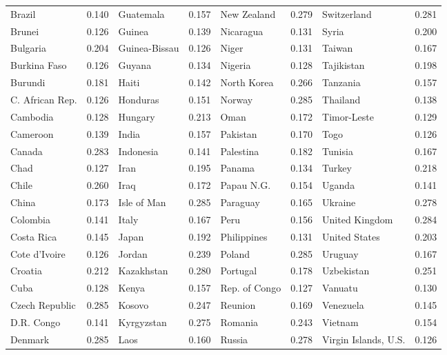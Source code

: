\documentclass[12pt]{article}
\begin{document}
\begin{table}[!htb]
\begin{center}
{\begin{tabularx}{\textwidth}{lXlXlXlX}
Brazil &     0.140 & Guatemala &     0.157 & New Zealand &     0.279 & Switzerland &     0.281 \\
Brunei &     0.126 & Guinea &     0.139 & Nicaragua &     0.131 & Syria &     0.200 \\
Bulgaria &     0.204 & Guinea-Bissau &     0.126 & Niger &     0.131 & Taiwan &     0.167 \\
Burkina Faso &     0.126 & Guyana &     0.134 & Nigeria &     0.128 & Tajikistan &     0.198 \\
Burundi &     0.181 & Haiti &     0.142 & North Korea &     0.266 & Tanzania &     0.157 \\
C. African Rep. &     0.126 & Honduras &     0.151 & Norway &     0.285 & Thailand &     0.138 \\
Cambodia &     0.128 & Hungary &     0.213 & Oman &     0.172 & Timor-Leste &     0.129 \\
Cameroon &     0.139 & India &     0.157 & Pakistan &     0.170 & Togo &     0.126 \\
Canada &     0.283 & Indonesia &     0.141 & Palestina &     0.182 & Tunisia &     0.167 \\
Chad &     0.127 & Iran &     0.195 & Panama &     0.134 & Turkey &     0.218 \\
Chile &     0.260 & Iraq &     0.172 & Papau N.G. &     0.154 & Uganda &     0.141 \\
China &     0.173 & Isle of Man &     0.285 & Paraguay &     0.165 & Ukraine &     0.278 \\
Colombia &     0.141 & Italy &     0.167 & Peru &     0.156 & United Kingdom &     0.284 \\
Costa Rica &     0.145 & Japan &     0.192 & Philippines &     0.131 & United States &     0.203 \\
Cote d'Ivoire &     0.126 & Jordan &     0.239 & Poland &     0.285 & Uruguay &     0.167 \\
Croatia &     0.212 & Kazakhstan &     0.280 & Portugal &     0.178 & Uzbekistan &     0.251 \\
Cuba &     0.128 & Kenya &     0.157 & Rep. of Congo &     0.127 & Vanuatu &     0.130 \\
Czech Republic &     0.285 & Kosovo &     0.247 & Reunion &     0.169 & Venezuela &     0.145 \\
D.R. Congo &     0.141 & Kyrgyzstan &     0.275 & Romania &     0.243 & Vietnam &     0.154 \\
Denmark &     0.285 & Laos &     0.160 & Russia &     0.278 & Virgin Islands, U.S. &     0.126 \\

\end{tabularx}}
\end{center}
\end{table}
\end{document}
